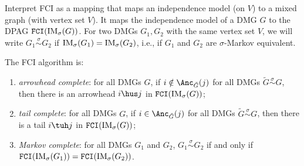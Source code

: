 Interpret FCI as a mapping that maps an independence model (on $V$) to a mixed graph (with vertex set $V$).
It maps the independence model of a DMG $G$ to the DPAG $\mathtt{FCI}(\mathrm{IM}_\sigma(G))$.
For two DMGs $G_1,G_2$ with the same vertex set $V$, we will write $G_1 \stackrel{\sigma}{\sim} G_2$ if $\mathrm{IM}_\sigma(G_1) = \mathrm{IM}_\sigma(G_2)$, i.e., if $G_1$ and $G_2$ are $\sigma$-Markov equivalent.
\begin{Thm}\label{thm:fci_sound_complete}
The FCI algorithm is:
  \begin{enumerate}[label=(\roman*)]
    \item \emph{arrowhead complete}: for all DMGs $G$, if $i \notin \Anc_{\tilde{G}}(j)$ for all DMGs $\tilde{G} \stackrel{\sigma}{\sim} G$, then there is an arrowhead $i \hus j$ in $\mathtt{FCI}(\mathrm{IM}_\sigma(G))$;
    \item \emph{tail complete}: for all DMGs $G$, if $i \in \Anc_{\tilde{G}}(j)$ for all DMGs $\tilde{G} \stackrel{\sigma}{\sim} G$, then there is a tail $i \tuh j$ in $\mathtt{FCI}(\mathrm{IM}_\sigma(G))$;
    \item \emph{Markov complete}: for all DMGs $G_1$ and $G_2$, $G_1 \stackrel{\sigma}{\sim} G_2$ if and only if $\mathtt{FCI}(\mathrm{IM}_\sigma(G_1)) = \mathtt{FCI}(\mathrm{IM}_\sigma(G_2))$.
  \end{enumerate}
\end{Thm}
